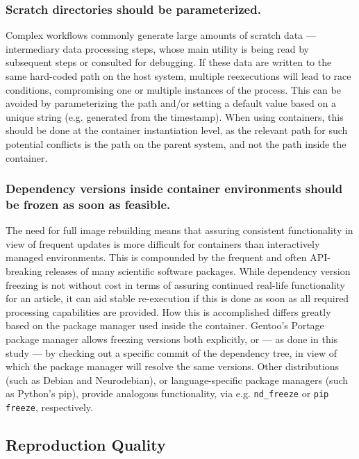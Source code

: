 \subsubsection{Scratch directories should be parameterized.}
Complex workflows commonly generate large amounts of scratch data — intermediary data processing steps, whose main utility is being read by subsequent steps or consulted for debugging.
If these data are written to the same hard-coded path on the host system, multiple reexecutions will lead to race conditions, compromising one or multiple instances of the process.
This can be avoided by parameterizing the path and/or setting a default value based on a unique string (e.g. generated from the timestamp).
When using containers, this should be done at the container instantiation level, as the relevant path for such potential conflicts is the path on the parent system, and not the path inside the container.

\subsubsection{Dependency versions inside container environments should be frozen as soon as feasible.}
The need for full image rebuilding means that assuring consistent functionality in view of frequent updates is more difficult for containers than interactively managed environments.
This is compounded by the frequent and often API-breaking releases of many scientific software packages.
While dependency version freezing is not without cost in terms of assuring continued real-life functionality for an article, it can aid stable re-execution if this is done as soon as all required processing capabilities are provided.
How this is accomplished differs greatly based on the package manager used inside the container.
Gentoo's Portage package manager allows freezing versions both explicitly, or — as done in this study — by checking out a specific commit of the dependency tree, in view of which the package manager will resolve the same versions.
Other distributions (such as Debian and Neurodebian), or language-specific package managers (such as Python's pip), provide analogous functionality, via e.g. \texttt{nd\_freeze} or \texttt{pip freeze}, respectively.


\subsection{Reproduction Quality}


